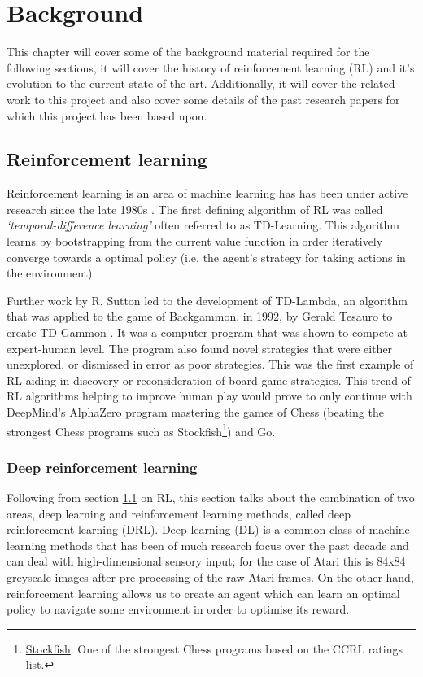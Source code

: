 \chapter{Background}
\label{cha:bg}

This chapter will cover some of the background material required for the following sections, it will cover the history of reinforcement learning (RL) and it's evolution to the current state-of-the-art. Additionally, it will cover the related work to this project and also cover some details of the past research papers for which this project has been based upon.

\section{Reinforcement learning}
\label{bg:sec:rl}
Reinforcement learning is an area of machine learning has has been under active research since the late 1980s \cite{watkins-phd}. The first defining algorithm of RL was called \textit{`temporal-difference learning'} often referred to as TD-Learning. This algorithm learns by bootstrapping from the current value function in order iteratively converge towards a optimal policy (i.e. the agent's strategy for taking actions in the environment).

Further work by R. Sutton led to the development of TD-Lambda, an algorithm that was applied to the game of Backgammon, in 1992, by Gerald Tesauro to create TD-Gammon \cite{td-gammon}. It was a computer program that was shown to compete at expert-human level. The program also found novel strategies that were either unexplored, or dismissed in error as poor strategies. This was the first example of RL aiding in discovery or reconsideration of board game strategies. This trend of RL algorithms helping to improve human play would prove to only continue with DeepMind's AlphaZero program mastering the games of Chess (beating the strongest Chess programs such as Stockfish\footnote{\href{https://stockfishchess.org}{Stockfish}. One of the strongest Chess programs based on the CCRL ratings list.}) and Go.

\subsection{Deep reinforcement learning}
\label{bg:sec:deeprl}
Following from section \ref{bg:sec:rl} on RL, this section talks about the combination of two areas, deep learning and reinforcement learning methods, called deep reinforcement learning (DRL). Deep learning (DL) is a common class of machine learning methods that has been of much research focus over the past decade and can deal with high-dimensional sensory input; for the case of Atari this is 84x84 greyscale images after pre-processing of the raw Atari frames. On the other hand, reinforcement learning allows us to create an agent which can learn an optimal policy to navigate some environment in order to optimise its reward.

